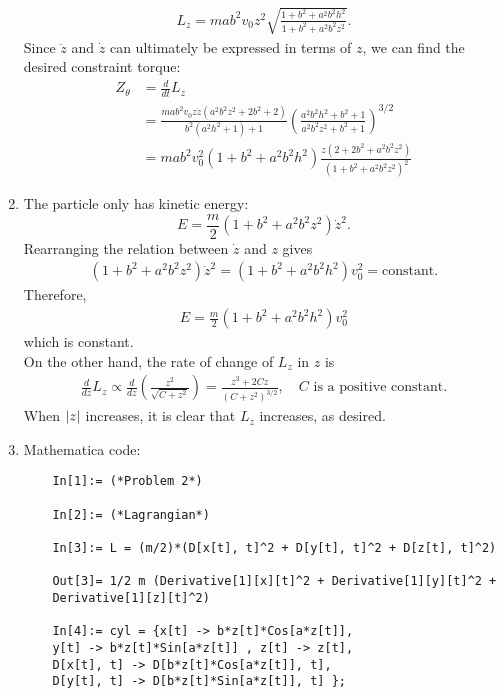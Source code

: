 \documentclass{article}
\theoremstyle{definition}
\newcommand{\f}[2]{\frac{#1}{#2}}
\newcommand{\lp}{\left(}
\newcommand{\rp}{\right)}
\begin{document}
\begin{enumerate}[label = (\alph*)]
	\begin{align*}
	L_z = mab^2 v_0 z^2 \sqrt{\f{1+b^2+a^2b^2h^2}{1+b^2+a^2b^2z^2}}.
	\end{align*}
	Since $\ddot{z}$ and $\dot{z}$ can ultimately be expressed in terms of $z$, we can find the desired constraint torque:
	\begin{align*}
	Z_\theta &= \f{d}{dt}L_z \\
	&= \frac{m a b^2 v_0 z\dot{z} \left(a^2 b^2 z^2+2 b^2+2\right) }{b^2 \left(a^2 h^2+1\right)+1} \left(\frac{a^2 b^2 h^2+b^2+1}{a^2 b^2 z^2+b^2+1}\right)^{3/2}\\
	&= \boxed{mab^2 v_0^2 (1+b^2+a^2b^2h^2)\f{z(2+2b^2 +a^2b^2 z^2)}{(1+b^2 + a^2b^2 z^2)^2}}
	\end{align*}
	
	
	\item The particle only has kinetic energy:
	\begin{equation*}
	E = \f{m}{2}(1+b^2+a^2b^2 z^2)\dot{z}^2.
	\end{equation*} 
	Rearranging the relation between $\dot{z}$ and $z$ gives
	\begin{align*}
	(1+b^2+a^2b^2z^2)\dot{z}^2 = (1+b^2+a^2b^2h^2)v_0^2 = \text{constant}.
	\end{align*}
	Therefore, 
	\begin{align*}
	{E = \f{m}{2}(1+b^2+a^2b^2h^2)v_0^2}
	\end{align*}
	which is constant. \\
	
	
	On the other hand, the rate of change of $L_z$ in $z$ is 
	\begin{align*}
	\f{d}{dz}L_z \propto \f{d}{dz} \lp  \f{z^2}{ \sqrt{{C+z^2}}} \rp = \f{z^3+2Cz}{(C+z^2)^{3/2}}, \quad C\text{ is a positive constant}.
	\end{align*}
	When $\abs{z}$ increases, it is clear that $L_z$ increases, as desired.  
	
	
	
	\item Mathematica code:
	\begin{lstlisting}
	In[1]:= (*Problem 2*)
	
	In[2]:= (*Lagrangian*)
	
	In[3]:= L = (m/2)*(D[x[t], t]^2 + D[y[t], t]^2 + D[z[t], t]^2)
	
	Out[3]= 1/2 m (Derivative[1][x][t]^2 + Derivative[1][y][t]^2 + 
	Derivative[1][z][t]^2)
	
	In[4]:= cyl = {x[t] -> b*z[t]*Cos[a*z[t]], 
	y[t] -> b*z[t]*Sin[a*z[t]] , z[t] -> z[t],
	D[x[t], t] -> D[b*z[t]*Cos[a*z[t]], t], 
	D[y[t], t] -> D[b*z[t]*Sin[a*z[t]], t] };
	

\end{lstlisting}
\end{enumerate}
\end{document}
